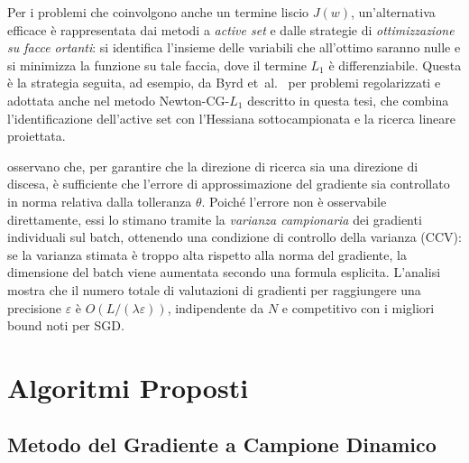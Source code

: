 \documentclass[a4paper,12pt]{article}
\numberwithin{equation}{section}
\numberwithin{figure}{section}
\numberwithin{table}{section}
\begin{document}
Per i problemi che coinvolgono anche un termine liscio $J(w)$, un'alternativa
efficace è rappresentata dai metodi a \emph{active set} e dalle strategie di
\emph{ottimizzazione su facce ortanti}: si identifica l'insieme delle variabili
che all'ottimo saranno nulle e si minimizza la funzione su tale faccia, dove il
termine $L_1$ è differenziabile. Questa è la strategia seguita, ad esempio, da
Byrd et~al.~\cite{byrd2011} per problemi regolarizzati e adottata anche nel
metodo Newton-CG-$L_1$ descritto in questa tesi, che combina l'identificazione
dell'active set con l'Hessiana sottocampionata e la ricerca lineare proiettata.

osservano che, per garantire che la direzione di ricerca sia una direzione di
discesa, è sufficiente che l'errore di approssimazione del gradiente sia
controllato in norma relativa dalla tolleranza $\theta$. Poiché l'errore non è
osservabile direttamente, essi lo stimano tramite la \emph{varianza campionaria}
dei gradienti individuali sul batch, ottenendo una condizione di controllo
della varianza (CCV): se la varianza stimata è troppo alta rispetto alla norma
del gradiente, la dimensione del batch viene aumentata secondo una formula
esplicita. L'analisi mostra che il numero totale di valutazioni di gradienti
per raggiungere una precisione $\varepsilon$ è $O(L/(\lambda\varepsilon))$,
indipendente da $N$ e competitivo con i migliori bound noti per SGD.

\section{Algoritmi Proposti}\label{sec:algoritmi}

\subsection{Metodo del Gradiente a Campione Dinamico}
\end{document}
